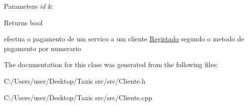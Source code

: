 \begin{DoxyParams}{Parameters}
{\em id} & \\
\hline
\end{DoxyParams}
\begin{DoxyReturn}{Returns}
bool
\end{DoxyReturn}
efectua o pagamento de um servico a um cliente \hyperlink{class_registado}{Registado} segundo o metodo de pagamento por numerario 

The documentation for this class was generated from the following files\+:\begin{DoxyCompactItemize}
\item 
C\+:/\+Users/user/\+Desktop/\+Taxis src/src/Cliente.\+h\item 
C\+:/\+Users/user/\+Desktop/\+Taxis src/src/Cliente.\+cpp\end{DoxyCompactItemize}
